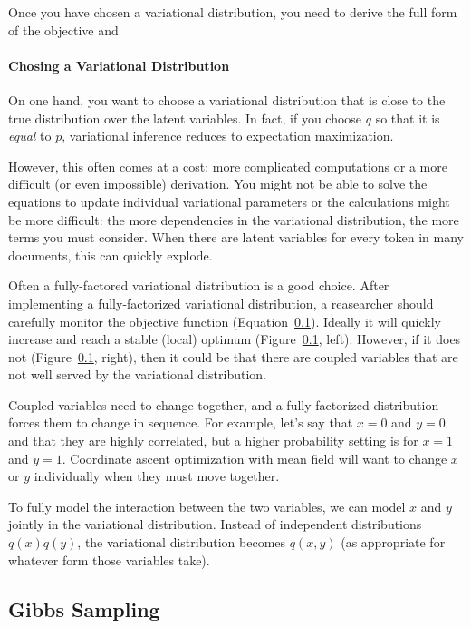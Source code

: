 Once you have chosen a variational distribution, you need to derive
the full form of the objective and

\paragraph{Chosing a Variational Distribution}

On one hand, you want to choose a variational distribution that is
close to the true distribution over the latent variables.  In fact, if
you choose $q$ so that it is \emph{equal} to $p$, variational
inference reduces to expectation maximization.

However, this often comes at a cost: more complicated computations or
a more difficult (or even impossible) derivation.  You might not be
able to solve the equations to update individual variational
parameters or the calculations might be more difficult: the more
dependencies in the variational distribution, the more terms you must
consider.  When there are latent variables for every token in many
documents, this can quickly explode.

Often a fully-factored variational distribution is a good choice.
After implementing a fully-factorized variational distribution, a
reasearcher should carefully monitor the objective function (Equation~\ref{}).  Ideally
it will quickly increase and reach a stable (local) optimum
(Figure~\ref{}, left).  However,
if it does not (Figure~\ref{}, right), then it could be that there are
coupled variables that are not well served by the variational
distribution.

Coupled variables need to change together, and a fully-factorized
distribution forces them to change in sequence.  For example, let's
say that $x=0$ and $y=0$ and that they are highly correlated, but a
higher probability setting is for $x=1$ and $y=1$.  Coordinate ascent
optimization with mean field will want to change $x$ or $y$
individually when they must move together.

To fully model the interaction between the two variables, we can model
$x$ and $y$ jointly in the variational distribution.  Instead of
independent distributions $q(x)q(y)$, the variational distribution
becomes $q(x,y)$ (as appropriate for whatever form those variables take).

\subsection{Gibbs Sampling}

